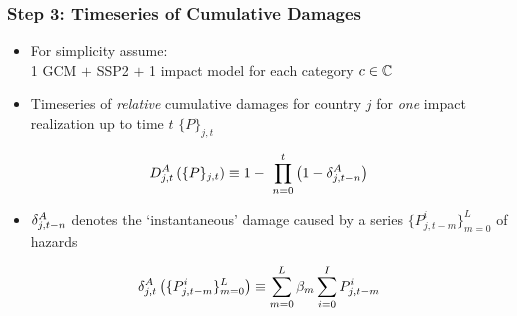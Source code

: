 \documentclass[
c,
11pt,
aspectratio=169, %
final,
]{beamer}
\begin{document}
\begin{frame}
  \frametitle{Step 3: Timeseries of Cumulative Damages}
      \begin{minipage}[l]{\linewidth}
        \begin{itemize}
  \item For simplicity assume:\\ 1 GCM $+$ SSP2 $+$ 1 impact model for each category $c\in\mathbb{C}$          
  \item Timeseries of \emph{relative} cumulative damages for country $j$ for \emph{one} impact realization up to time $t$ $\lbrace P\rbrace_{j,t}$  
  \end{itemize}
  \begin{equation*}
     \DA_{j,t}\left(\lbrace P\rbrace_{j,t}\right)\equiv 1 - \ \prod_{n=0}^{t}\left(1-\dA_{j,t-n}\right)
   \end{equation*}
   \begin{itemize}
\item  $\delta^A_{j,t-n}$ denotes the `instantaneous' damage caused by a series $\lbrace P_{j,t-m}^i\rbrace_{m=0}^L$ of hazards   
   \end{itemize}
  \begin{equation*}
    \delta^A_{j,t}\left(\lbrace P_{j,t-m}^i\rbrace_{m=0}^L\right)\equiv \sum_{m=0}^L\beta_m\sum_{i=0}^IP_{j,t-m}^i
  \end{equation*}

\end{minipage}\hfill
\begin{minipage}[r]{0\linewidth}
\end{minipage}
\end{frame}
\end{document}
